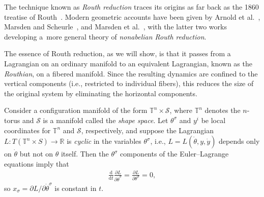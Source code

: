 \documentclass[10pt,a4paper]{amsart}
\numberwithin{equation}{section}
\begin{document}
The technique known as \emph{Routh reduction} traces its origins as far back as the 1860 treatise of Routh~\cite{Routh1860}. Modern geometric accounts have been given by Arnold et al.~\cite{ArKoNe1988}, Marsden and Scheurle~\cite{MaSc1993}, and Marsden et al.~\cite{MaRaSc2000}, with the latter two works developing a~more general theory of \emph{nonabelian Routh reduction}.

The essence of Routh reduction, as we will show, is that it passes from a Lagrangian on an ordinary manifold to an equivalent Lagrangian, known as the \emph{Routhian}, on a f\/ibered manifold. Since the resulting dynamics are conf\/ined to the vertical components (i.e., restricted to individual f\/ibers), this reduces the size of the original system by eliminating the horizontal components.

Consider a conf\/iguration manifold of the form $ \mathbb{T} ^n \times \mathcal{S} $, where $ \mathbb{T} ^n $ denotes the $n$-torus and $\mathcal{S}$ is a manifold called the \emph{shape space}. Let $ \theta ^\sigma $ and $ y ^i $ be local coordinates for $ \mathbb{T} ^n $ and $\mathcal{S}$, respectively, and suppose the Lagrangian $ L \colon T ( \mathbb{T} ^n \times S ) \rightarrow \mathbb{R} $ is \emph{cyclic} in the variables $ \theta ^\sigma $, i.e.,
$L = L ( \dot{\theta} , y , \dot{y} ) $ depends only on $ \dot{ \theta } $ but not on $ \theta $ itself. Then the $ \theta ^\sigma $ components of the Euler--Lagrange equations imply that
\begin{gather*}
 \frac{\mathrm{d}}{\mathrm{d}t} \frac{ \partial L }{ \partial \dot{\theta} ^\sigma } = \frac{ \partial L }{ \partial \theta
 ^\sigma } = 0,
\end{gather*}
so $ x _\sigma = \partial L / \partial \dot{\theta} ^\sigma $ is constant in $t$.
\end{document}
